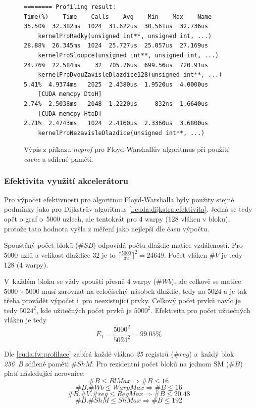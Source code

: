 \begin{figure}
	\centering
	\begin{verbatim}
======== Profiling result:
Time(%)    Time    Calls    Avg    Min    Max    Name
35.50%  32.382ms  1024  31.622us  30.561us  32.736us
    kernelProRadky(unsigned int**, unsigned int, ...)
28.88%  26.345ms  1024  25.727us  25.057us  27.169us
    kernelProSloupce(unsigned int**, unsigned int, ...)
24.76%  22.584ms    32  705.76us  699.56us  720.91us
    kernelProDvouZavisleDlazdice128(unsigned int**, ...)
5.41%  4.9374ms   2025  2.4380us  1.9520us  4.0000us
    [CUDA memcpy DtoH]
2.74%  2.5038ms   2048  1.2220us     832ns  1.6640us
    [CUDA memcpy HtoD]
2.71%  2.4743ms   1024  2.4160us  2.3360us  3.6800us
    kernelProNezavisleDlazdice(unsigned int**, ...)
	\end{verbatim}
	\caption{Výpis z příkazu \emph{nvprof} pro Floyd-Warshallův algoritmus při použití \emph{cache} a sdílené paměti.}
    \label{f:cuda:floyd:profilace2}
\end{figure}

\subsubsection{Efektivita využití akcelerátoru} \label{l:cuda:floyd:efektivita}
Pro výpočet efektivnosti pro algoritmu Floyd-Warshalla byly použity stejné podmínky jako pro Dijkstrův algoritmus \ref{l:cuda:dijkstra:efektivita}. Jedná se tedy opět o graf o~5000 uzlech, ale tentokrát pro 4 warpy (128 vláken v bloku), protože tato hodnota vyšla z měření jako nejlepší dle času výpočtu.

Spouštěný počet bloků ($\#SB$) odpovídá počtu dlaždic matice vzdáleností. Pro $5000$ uzlů a velikost dlaždice $32$ je to 
$\lceil \frac{5000}{32} \rceil ^ 2 = 24649$. Počet vláken $\#V$ je tedy 128 (4 warpy).

V~každém bloku se vždy spouští přesně 4 warpy ($ \#Wb $), ale celkově se matice $5000 \times 5000$ musí zarovnat na celočíselný násobek
dlaždic, tedy na $5024$ a je tak třeba provádět výpočet i~pro neexistující prvky. Celkový počet prvků navíc je tedy $ 5024^2 $, kde 
užitečných počet prvků je $ 5000^2 $. Efektivita pro počet užitečných vláken je tedy
$$ E_1 = \frac{5000^2}{5024^2} = 99.05 \% $$


Dle \ref{cuda:fw:profilace} zabírá každé vlákno \emph{25} registrů ($\#reg$) a~každý blok \emph{256~B} sdílené paměti $\#ShM$. Pro rezidentní počet 
bloků na jednom SM ($\#B$)  platí následující nerovnice:
$$               \#B \leq BlMax   \Rightarrow  \#B \leq 16    $$
$$        \#B . \#Wb \leq WarpMax \Rightarrow  \#B \leq 16    $$
$$ \#B . \#V . \#reg \leq RegMax  \Rightarrow  \#B \leq 20.48 $$
$$       \#B . \#ShM \leq ShMax   \Rightarrow  \#B \leq 192   $$

